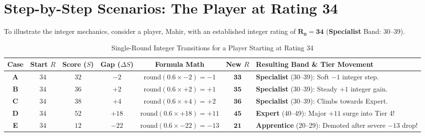 \section{Step-by-Step Scenarios: The Player at Rating 34}
To illustrate the integer mechanics, consider a player, Mahir, with an established integer rating of $\mathbf{R_0 = 34}$ (\textbf{Specialist} Band: 30--39).

\begin{table}[htbp]
\centering
\scriptsize
\begin{tabular}{|c|c|c|c|c|c|p{5.4cm}|}
\hline
\rowcolor{primaryBlue!15}
\textbf{Case} & \textbf{Start $R$} & \textbf{Score ($S$)} & \textbf{Gap ($\Delta S$)} & \textbf{Formula Math} & \textbf{New $R$} & \textbf{Resulting Band \& Tier Movement} \\ \hline
\textbf{A} & $34$ & $32$ & $-2$ & $\text{round}(0.6 \times -2) = -1$ & $\mathbf{33}$ & \textbf{Specialist} (30--39): Soft $-1$ integer step. \\ \hline
\textbf{B} & $34$ & $36$ & $+2$ & $\text{round}(0.6 \times +2) = +1$ & $\mathbf{35}$ & \textbf{Specialist} (30--39): Steady $+1$ integer gain. \\ \hline
\textbf{C} & $34$ & $38$ & $+4$ & $\text{round}(0.6 \times +4) = +2$ & $\mathbf{36}$ & \textbf{Specialist} (30--39): Climbs towards Expert. \\ \hline
\textbf{D} & $34$ & $52$ & $+18$ & $\text{round}(0.6 \times +18) = +11$ & $\mathbf{45}$ & \textbf{Expert} (40--49): Major $+11$ surge into Tier 4! \\ \hline
\textbf{E} & $34$ & $12$ & $-22$ & $\text{round}(0.6 \times -22) = -13$ & $\mathbf{21}$ & \textbf{Apprentice} (20--29): Demoted after severe $-13$ drop! \\ \hline
\end{tabular}
\caption{Single-Round Integer Transitions for a Player Starting at Rating 34}
\end{table}

